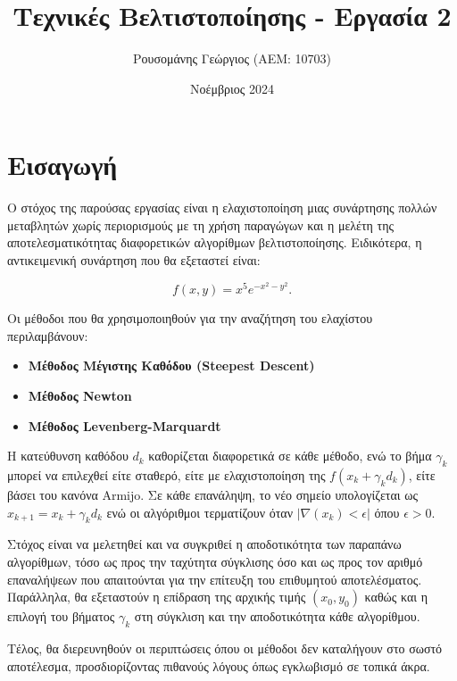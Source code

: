 \documentclass[a4paper,12pt]{article}
\title{Τεχνικές Βελτιστοποίησης - Εργασία 2}
\author{Ρουσομάνης Γεώργιος (ΑΕΜ: 10703)}
\date{Νοέμβριος 2024}
\begin{document}
\maketitle

\section*{Εισαγωγή}

Ο στόχος της παρούσας εργασίας είναι η ελαχιστοποίηση μιας συνάρτησης πολλών μεταβλητών χωρίς περιορισμούς με 
τη χρήση παραγώγων και η μελέτη της αποτελεσματικότητας διαφορετικών αλγορίθμων βελτιστοποίησης. Ειδικότερα,
η αντικειμενική συνάρτηση που θα εξεταστεί είναι:

\[
f(x, y) = x^5 e^{-x^2 - y^2}.
\]

Οι μέθοδοι που θα χρησιμοποιηθούν για την αναζήτηση του ελαχίστου περιλαμβάνουν:
\begin{itemize}
    \item \textbf{Μέθοδος Μέγιστης Καθόδου  (Steepest Descent) }
    \item \textbf{Μέθοδος  Newton}
    \item \textbf{Μέθοδος  Levenberg-Marquardt}
\end{itemize}

Η κατεύθυνση καθόδου $d_k$ καθορίζεται διαφορετικά σε κάθε μέθοδο, ενώ το βήμα $\gamma_k$ μπορεί να επιλεχθεί
είτε σταθερό, είτε με ελαχιστοποίηση της $f(x_k + \gamma_k d_k)$, είτε βάσει του κανόνα 
 Armijo. 
Σε κάθε επανάληψη, το νέο σημείο υπολογίζεται ως $x_{k+1} = x_k + \gamma_k d_k$
ενώ οι αλγόριθμοι τερματίζουν όταν $|\nabla(x_k) < \epsilon|$ όπου $\epsilon > 0$. 

Στόχος είναι να μελετηθεί και να συγκριθεί η αποδοτικότητα των παραπάνω αλγορίθμων, τόσο ως προς την ταχύτητα σύγκλισης 
όσο και ως προς τον αριθμό επαναλήψεων που απαιτούνται για την επίτευξη του επιθυμητού αποτελέσματος. Παράλληλα, 
θα εξεταστούν η επίδραση της αρχικής τιμής $(x_0, y_0)$ καθώς και η επιλογή του βήματος $\gamma_k$ στη σύγκλιση 
και την αποδοτικότητα κάθε αλγορίθμου.

Τέλος, θα διερευνηθούν οι περιπτώσεις όπου οι μέθοδοι δεν καταλήγουν στο σωστό αποτέλεσμα, προσδιορίζοντας 
πιθανούς λόγους όπως εγκλωβισμό σε τοπικά άκρα.
\end{document}
